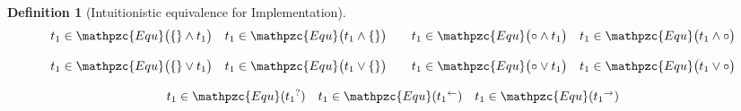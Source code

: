 \documentclass[12pt]{article}
\newtheorem{Definition}{Definition}[section]
\begin{document}
\begin{Definition}[Intuitionistic equivalence for Implementation]
\begin{displaymath}
\begin{array}{c}
      \begin{array}{ll}
        \begin{array}{ll}
          t_1 \in \mathpzc{Equ}\bigl(\{\} \wedge t_1 \bigr)
          & t_1 \in \mathpzc{Equ}\bigl(t_1 \wedge \{\} \bigr)
        \end{array}
        & \begin{array}{ll}
            t_1 \in \mathpzc{Equ}\bigl(\circ \wedge t_1 \bigr)
            & t_1 \in \mathpzc{Equ}\bigl(t_1 \wedge \circ \bigr)
          \end{array}
      \end{array}  \\
      \\
      
      \begin{array}{ll}
        \begin{array}{ll}
          t_1 \in \mathpzc{Equ}\bigl(\{\} \vee t_1 \bigr)
          & t_1 \in \mathpzc{Equ}\bigl(t_1 \vee \{\} \bigr)
        \end{array}
        & \begin{array}{ll}
            t_1 \in \mathpzc{Equ}\bigl(\circ \vee t_1 \bigr)
            & t_1 \in \mathpzc{Equ}\bigl(t_1 \vee \circ \bigr)
          \end{array}
      \end{array}  \\
      \\
      
      \begin{array}{lll}
        t_1 \in \mathpzc{Equ}({t_1}^?)
        & t_1 \in \mathpzc{Equ}({t_1}^{\leftarrow})
        & t_1 \in \mathpzc{Equ}({t_1}^{\rightarrow})
      \end{array}
      
    \end{array}
  \end{displaymath}
\end{Definition}
\end{document}
